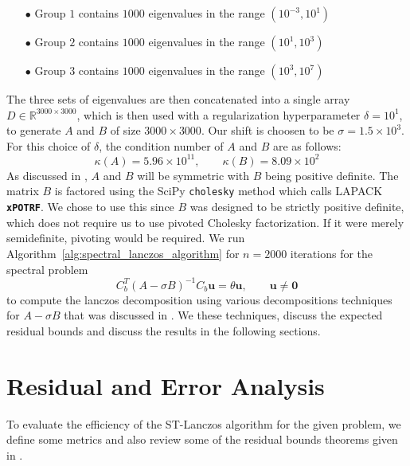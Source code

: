 \begin{itemize}
    \item[$\bullet$] Group $1$ contains $1000$ eigenvalues in the range $(10^{-3}, 10^{1})$
    \item[$\bullet$] Group $2$ contains $1000$ eigenvalues in the range $(10^1, 10^3)$
    \item[$\bullet$] Group $3$ contains $1000$ eigenvalues in the range $(10^3, 10^7)$
\end{itemize}

The three sets of eigenvalues are then concatenated into a single array $D \in \mathbb{R}^{3000 \times 3000}$, which is then used with a regularization hyperparameter $\delta = 10^{1}$, to generate $A$ and $B$ of size $3000 \times 3000$. Our shift is choosen to be $\sigma = 1.5 \times 10^3$. For this choice of $\delta$, the condition number of $A$ and $B$ are as follows:
\begin{equation*}
    \kappa(A) = 5.96 \times 10^{11}, \qquad \kappa(B) = 8.09 \times 10^2
\end{equation*}
As discussed in , $A$ and $B$ will be symmetric with $B$ being positive definite. The matrix $B$ is factored using the SciPy \texttt{cholesky} method which calls LAPACK \textbf{\texttt{xPOTRF}}. We chose to use this since $B$ was designed to be strictly positive definite, which does not require us to use  pivoted Cholesky factorization. If it were merely semidefinite, pivoting would be required. We run Algorithm~\ref{alg:spectral_lanczos_algorithm} for $n=2000$ iterations for the spectral problem
\begin{equation}\label{eq:ShiftedInvertedProblem2}
	C_b^T (A-\sigma B)^{-1} C_b \mathbf{u} = \theta \mathbf{u}, \qquad \mathbf{u} \neq \mathbf{0}
\end{equation}
to compute the lanczos decomposition using various decompositions techniques for $A - \sigma B$ that was discussed in . We  these techniques, discuss the expected residual bounds and discuss the results in the following sections.

\section{Residual and Error Analysis}

To evaluate the efficiency of the ST-Lanczos algorithm for the given problem, we define some metrics and also review some of the residual bounds theorems given in \cite{stewart2024spectraltransformationdensesymmetric}.

